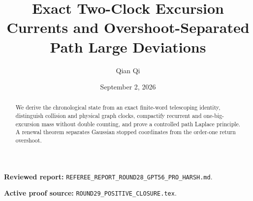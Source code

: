 \documentclass[11pt,reqno]{amsart}
\title[A3 Round 29 revision]{Exact Two-Clock Excursion Currents and Overshoot-Separated Path Large Deviations}
\author{Qian Qi}
\date{September 2, 2026}
\begin{document}
\begin{abstract}We derive the chronological state from an exact finite-word telescoping identity, distinguish collision and physical graph clocks, compactify recurrent and one-big-excursion mass without double counting, and prove a controlled path Laplace principle. A renewal theorem separates Gaussian stopped coordinates from the order-one return overshoot.\end{abstract}
\maketitle
\noindent\textbf{Reviewed report:} \texttt{REFEREE\_REPORT\_ROUND28\_GPT56\_PRO\_HARSH.md}.\par
\noindent\textbf{Active proof source:} \texttt{ROUND29\_POSITIVE\_CLOSURE.tex}.\par

\end{document}
